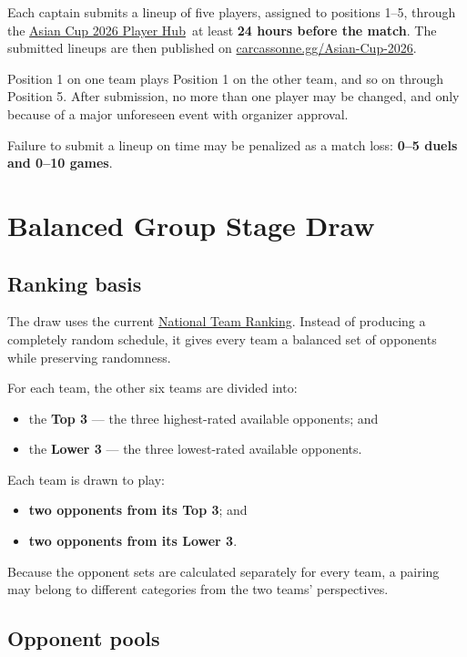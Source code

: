 \documentclass[10pt,a4paper]{article}
\newcommand{\term}[1]{\textbf{#1}}
\newcommand{\TournamentPage}{\href{https://carcassonne.gg/Asian-Cup-2026/}{carcassonne.gg/Asian-Cup-2026}}
\newcommand{\PlayerHub}{\href{https://carcassonne.gg/player-hub/tournaments/?id=Asian-Cup-2026}{Asian Cup 2026 Player Hub}}
\newcommand{\RankingPage}{\href{https://carcassonne.gg/National-Teams-Ranking/}{National Team Ranking}}
\begin{document}
Each captain submits a lineup of five players, assigned to positions 1--5,
through the \PlayerHub\ at least \term{24 hours before the match}. The
submitted lineups are then published on \TournamentPage.

Position 1 on one team plays Position 1 on the other team, and so on through
Position 5. After submission, no more than one player may be changed, and only
because of a major unforeseen event with organizer approval.

Failure to submit a lineup on time may be penalized as a match loss:
\term{0--5 duels and 0--10 games}.

\section{Balanced Group Stage Draw}
\label{sec:draw}

\subsection{Ranking basis}

The draw uses the current \RankingPage. Instead of producing a completely
random schedule, it gives every team a balanced set of opponents while
preserving randomness.

For each team, the other six teams are divided into:

\begin{itemize}
  \item the \term{Top 3} --- the three highest-rated available opponents; and
  \item the \term{Lower 3} --- the three lowest-rated available opponents.
\end{itemize}

Each team is drawn to play:

\begin{itemize}
  \item \term{two opponents from its Top 3}; and
  \item \term{two opponents from its Lower 3}.
\end{itemize}

Because the opponent sets are calculated separately for every team, a pairing
may belong to different categories from the two teams' perspectives.

\subsection{Opponent pools}
\end{document}

